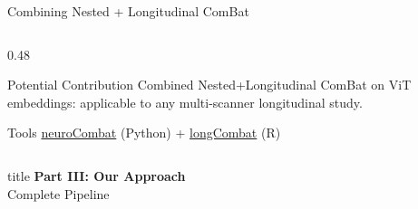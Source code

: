 \documentclass[aspectratio=169,xcolor=dvipsnames]{beamer}
\begin{document}
\begin{frame}{Combining Nested + Longitudinal ComBat}
\begin{columns}
\begin{column}{0.48\textwidth}
            \vspace{0.2em}

            \begin{alertblock}{\small Potential Contribution}
                \scriptsize
                Combined Nested+Longitudinal ComBat on ViT embeddings: applicable to any multi-scanner longitudinal study.
            \end{alertblock}

            \vspace{0.2em}

            \begin{exampleblock}{\scriptsize {} Tools}
                \scriptsize
                \href{https://github.com/Jfortin1/neuroCombat}{neuroCombat} (Python) + \href{https://github.com/jcbeer/longCombat}{longCombat} (R)
            \end{exampleblock}
        \end{column}
    \end{columns}
\end{frame}

\begin{frame}[plain]
    \centering
    \vfill
    \begin{beamercolorbox}[center,shadow=true,rounded=true]{title}
        \textbf{Part III: Our Approach}\\
        \vspace{0.5em}
        \large Complete Pipeline
    \end{beamercolorbox}
    \vfill
\end{frame}
\end{document}
